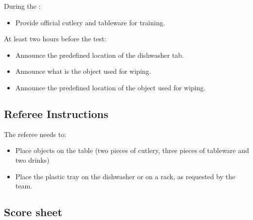 During the \SetupDays:
\begin{itemize}
	\item Provide official cutlery and tableware for training.
\end{itemize}
At least two hours before the test:
\begin{itemize}
	\item Announce the predefined location of the dishwasher tab.
	\item Announce what is the object used for wiping.
	\item Announce the predefined location of the object used for wiping.
\end{itemize}


\subsection*{Referee Instructions}

The referee needs to:
\begin{itemize}
	\item Place objects on the table (two pieces of cutlery, three pieces of tableware and two drinks)
	\item Place the plastic tray on the dishwasher or on a rack, as requested by the team.
\end{itemize}

\subsection*{Score sheet}


